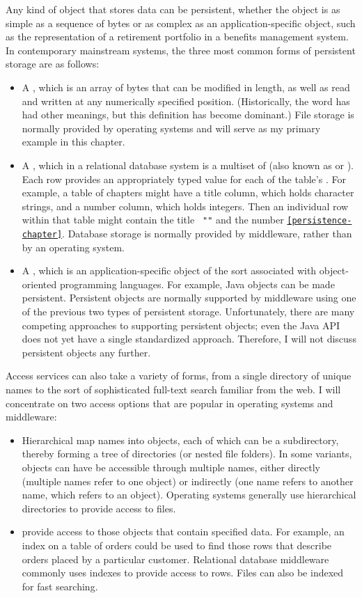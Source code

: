 Any kind of object that stores data can be persistent,
whether the object is as simple as a
sequence of bytes or as complex as an application-specific object,
such as the representation of a retirement portfolio in a benefits
management system.  In contemporary mainstream systems, the three most
common forms of persistent storage are as follows:
\begin{itemize}
\item
A , which is an array of bytes that can be modified in length, as
well as read and written at any numerically specified position.
(Historically, the word has had other meanings, but this definition
has become dominant.)  File storage is normally provided by operating
systems and will serve as my primary example in this chapter.
\item
A , which in a relational database system is a multiset of
 (also known as  or ). Each row provides an
appropriately typed value for each of the table's .
For example, a table of chapters might have a title column, which holds
character strings, and a number column, which holds integers.  Then an
individual row within that table might contain the title {\tt
"\persistenceChapterTitle"} and the number {\tt \ref{persistence-chapter}}.
Database storage is normally provided by middleware, rather than by an
operating system.
\item
A , which is
an application-specific object of the sort associated with
object-oriented programming languages.  For example, Java objects
can be made persistent.  Persistent objects
are normally supported by middleware using one of the previous two
types of persistent storage.  Unfortunately, there are many
competing approaches to supporting persistent objects; even the Java
API does not yet have a single standardized approach.  Therefore, I will not
discuss persistent objects any further.
\end{itemize}

Access services can also take a variety of forms, from a single
directory of unique names to the sort of sophisticated full-text
search familiar from the web.  I will concentrate on two access options
that are popular in operating systems and middleware:
\begin{itemize}
\item
Hierarchical  map names into objects, each of
which can be a subdirectory, thereby forming a tree of directories (or
nested file folders). In some variants, objects can have be accessible
through multiple names, either directly (multiple names refer to one
object) or indirectly (one name refers to another name, which refers
to an object).  Operating systems generally use hierarchical
directories to provide access to files.
\item
{} provide access to those objects that contain specified data.
For example, an index on a table of orders could be used to find those rows
that describe orders placed by a particular customer.  Relational database
middleware commonly uses indexes to provide access to rows.   Files
can also be indexed for fast searching.
\end{itemize}


